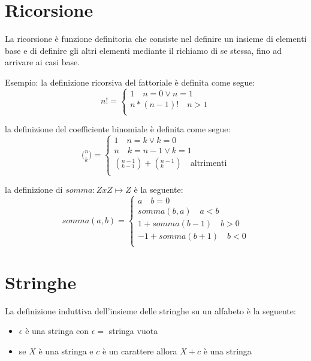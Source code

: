 \section{Ricorsione}
La ricorsione è funzione definitoria che consiste nel definire un insieme
di elementi base e di definire gli altri elementi mediante il richiamo di se stessa,
fino ad arrivare ai casi base.

Esempio:
la definizione ricorsiva del fattoriale è definita come segue:
\begin{equation*}
    n! = \begin{cases} 1 \quad n = 0 \lor n = 1 \\ n * (n-1)! \quad n > 1\\
\end{cases}
\end{equation*}

la definizione del coefficiente binomiale è definita come segue:
\begin{equation*}
    \bigl( ^ n _ k \bigr) = \begin{cases} 1 \quad n = k \lor k = 0 \\
                             n \quad k = n-1 \lor k = 1 \\
                             (^{n-1} _{k-1}) + (^{n-1} _k) \quad \text{altrimenti} \\
                \end{cases}
\end{equation*}

la definizione di $somma:Z x Z \mapsto Z$ è la seguente:
\begin{equation*}
    somma(a,b) = \begin{cases} a \quad b = 0 \\
                               somma(b,a) \quad a < b \\
                               1 + somma(b-1) \quad b > 0\\
                               -1 + somma(b+1) \quad b < 0 \\
                  \end{cases}
\end{equation*}

\section{Stringhe}
La definizione induttiva dell'insieme delle stringhe su un alfabeto è la seguente:
\begin{itemize}
    \item $\epsilon$ è una stringa con $\epsilon = $ stringa vuota
    \item se $X$ è una stringa e $c$ è un carattere allora $X+c$ è una stringa
\end{itemize}
